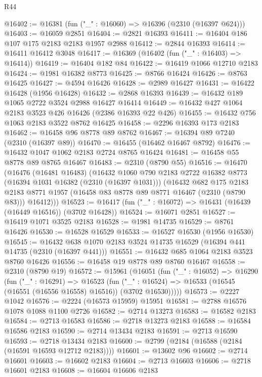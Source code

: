 \begin{lexlean}{R44}
\begin{coremodule}
@16402 := @16381 (fun ("_" : @16060) => @16396 (@2310 (@16397 @624)))
@16403 := @16059 @2851
@16404 := @2821 @16393
@16411 := @16404 @186 @107 @175 @2183 @2183 @1957 @2988
@16412 := @2844 @16393
@16414 := @16411 @16412 @3048
@16417 := @16369 (@16402 (fun ("_" : @16403) => @16414))
@16419 := @16404 @182 @84
@16422 := @16419 @1066 @12710 @2183
@16424 := @1981 @16382 @8773
@16425 := @8766 @16424
@16426 := @8763 @16425
@16427 := @4594 @16426
@16428 := @2989 @16427
@16431 := @16422 @16428 (@1956 @16428)
@16432 := @2868 @16393
@16439 := @16432 @189 @1065 @2722 @3524 @2988 @16427 @16414
@16449 := @16432 @427 @1064 @2183 @3523 @426 @16426 (@2386 @16393 @22 @426)
@16455 := @16432 @756 @1063 @2183 @3522 @8762 @16425
@16458 := @2296 @16393 @173 @2183
@16462 := @16458 @96 @8778 @89 @8762
@16467 := @16394 @89 @7240 (@2310 (@16397 @89))
@16470 := @16455 (@16462 @16467 @8792)
@16476 := @16432 @1047 @1062 @2183 @2724 @8765 @16424
@16481 := @16458 @55 @8778 @89 @8765 @16467
@16483 := @2310 (@8790 @55)
@16516 := @16470
    (@16476
      (@16481 @16483)
      (@16432
        @1060
        @790
        @2183
        @2722
        @16382
        @8773
        (@16394 @1031 @16382 (@2310 (@16397 @1031)))
        (@16432
          @682
          @175
          @2183
          @2183
          @8771
          @1957
          (@16458 @83 @8778 @89 @8771 @16467 (@2310 (@8790 @83)))
          @16412)))
@16523 := @16417 (fun ("_" : @16072) => @16431 (@16439 (@16449 @16516)) (@3702 @16428))
@16524 := @16071 @2851
@16527 := @16419 @1071 @3525 @2183
@16528 := @1981 @14735
@16529 := @8761 @16426
@16530 := @16528 @16529
@16533 := @16527 @16530 (@1956 @16530)
@16545 := @16432 @638 @1070 @2183 @3524 @14735 @16529 (@16394 @441 @14735 (@2310 (@16397 @441)))
@16551 := @16432 @685 @1064 @2183 @3523 @8760 @16426
@16556 := @16458 @19 @8778 @89 @8760 @16467
@16558 := @2310 (@8790 @19)
@16572 := @15961
    (@16051
      (fun ("_" : @16052) =>
      @16290
        (fun ("_" : @16291) =>
        @16523
          (fun ("_" : @16524) => @16533 (@16545 (@16551 (@16556 @16558) @16516)) (@3702 @16530)))))
@16573 := @2227 @1042
@16576 := @2224 (@16573 @15959) @15951
@16581 := @2788 @16576 @1078 @1088 @1100 @2726
@16582 := @2714 @13273
@16583 := @16582 @2183
@16584 := @2713 @16583
@16586 := @2718 @13273 @2183
@16588 := @16584 @16586 @2183
@16590 := @2714 @13434 @2183
@16591 := @2713 @16590
@16593 := @2718 @13434 @2183
@16600 := @2799 (@2184 (@16588 (@2184 (@16591 @16593 @12712 @2183))))
@16601 := @13602 @96
@16602 := @2714 @16601
@16603 := @16602 @2183
@16604 := @2713 @16603
@16606 := @2718 @16601 @2183
@16608 := @16604 @16606 @2183

\end{coremodule}
\end{lexlean}
